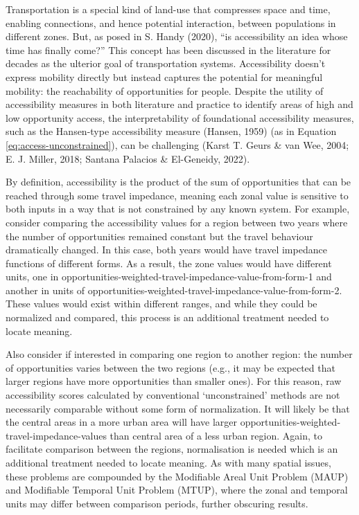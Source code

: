 \documentclass[
11pt, %
oneside, %
english, %
singlespacing, %
]{macthesis} %
\begin{document}
Transportation is a special kind of land-use that compresses space and time, enabling connections, and hence potential interaction, between populations in different zones. But, as posed in S. Handy (2020), ``is accessibility an idea whose time has finally come?'' This concept has been discussed in the literature for decades as the ulterior goal of transportation systems. Accessibility doesn't express mobility directly but instead captures the potential for meaningful mobility: the reachability of opportunities for people. Despite the utility of accessibility measures in both literature and practice to identify areas of high and low opportunity access, the interpretability of foundational accessibility measures, such as the Hansen-type accessibility measure (Hansen, 1959) (as in Equation \ref{eq:access-unconstrained}), can be challenging (Karst T. Geurs \& van Wee, 2004; E. J. Miller, 2018; Santana Palacios \& El-Geneidy, 2022).

By definition, accessibility is the product of the sum of opportunities that can be reached through some travel impedance, meaning each zonal value is sensitive to both inputs in a way that is not constrained by any known system. For example, consider comparing the accessibility values for a region between two years where the number of opportunities remained constant but the travel behaviour dramatically changed. In this case, both years would have travel impedance functions of different forms. As a result, the zone values would have different units, one in opportunities-weighted-travel-impedance-value-from-form-1 and another in units of opportunities-weighted-travel-impedance-value-from-form-2. These values would exist within different ranges, and while they could be normalized and compared, this process is an additional treatment needed to locate meaning.

Also consider if interested in comparing one region to another region: the number of opportunities varies between the two regions (e.g., it may be expected that larger regions have more opportunities than smaller ones). For this reason, raw accessibility scores calculated by conventional `unconstrained' methods are not necessarily comparable without some form of normalization. It will likely be that the central areas in a more urban area will have larger opportunities-weighted-travel-impedance-values than central area of a less urban region. Again, to facilitate comparison between the regions, normalisation is needed which is an additional treatment needed to locate meaning. As with many spatial issues, these problems are compounded by the Modifiable Areal Unit Problem (MAUP) and Modifiable Temporal Unit Problem (MTUP), where the zonal and temporal units may differ between comparison periods, further obscuring results.
\end{document}
